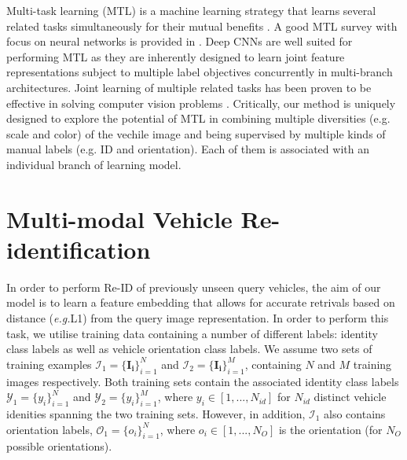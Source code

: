 \documentclass[10pt,twocolumn,letterpaper]{article}
\def\eg{\emph{e.g.\hspace{0.3em}}}
\begin{document}
Multi-task learning (MTL) is a machine learning strategy
that learns several related tasks simultaneously for
their mutual benefits \cite{argyriou2007multi}. %
A good MTL survey with focus on neural networks
is provided in \cite{caruana1997multitask}.
%
Deep CNNs are well suited for
performing MTL as they are inherently designed to learn joint
feature representations subject to multiple label objectives
concurrently in multi-branch architectures.
%
Joint learning of multiple related tasks
has been proven to be effective in solving computer vision problems
\cite{dong2017multi,zhang2016learning}.
%
Critically, our method is uniquely designed to
explore the potential of MTL
in combining multiple diversities (e.g. scale and color) of the vechile image
and being supervised by multiple kinds of manual labels (e.g. ID and orientation).
Each of them is associated with an individual branch of learning model.


\section{Multi-modal Vehicle Re-identification}

In order to perform Re-ID of previously unseen query vehicles, the aim of our model is to learn a feature embedding that allows for accurate retrivals based on distance (\eg L1) from the query image representation. In order to perform this task, we utilise training data containing a number of different labels: identity class labels as well as vehicle orientation class labels.
We assume two sets of training examples $\mathcal{I}_1 = \{\mathbf{I_i}\}_{i=1}^N$ and $\mathcal{I}_2 = \{\mathbf{I_i}\}_{i=1}^M$, containing $N$ and $M$ training images respectively. Both training sets contain the associated identity class labels $\mathcal{Y}_1=\{y_i\}_{i=1}^N$ and $\mathcal{Y}_2=\{y_i\}_{i=1}^M$, where $y_i \in \left[1,...,N_{id}\right]$ for $N_{id}$ distinct vehicle idenities spanning the two training sets. However, in addition, $\mathcal{I}_1$ also contains orientation labels, $\mathcal{O_1}=\{o_i\}_{i=1}^N$, where $o_i \in \left[1,...,N_O\right]$ is the orientation (for $N_O$ possible orientations).
\end{document}
